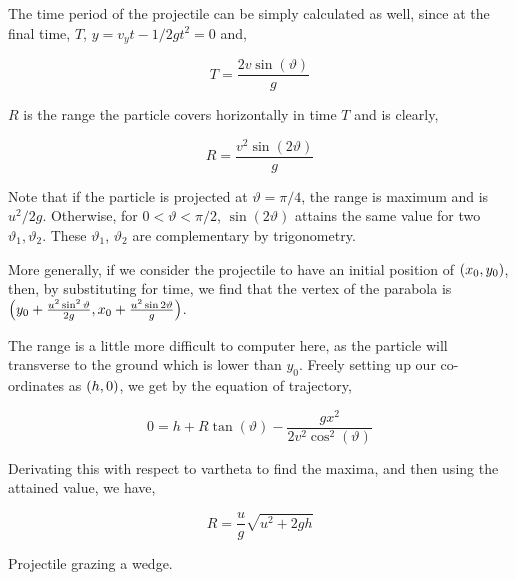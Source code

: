 The time period of the projectile can be simply calculated as well,
since at the final time, \(T\), \(y = v_yt - 1/2gt^2 = 0\) and,

\begin{equation}
    T = \frac{2v\sin(\vartheta)}{g}
\end{equation}

\(R\) is the range the particle covers horizontally in time \(T\) and is
clearly,

\begin{equation}
    R = \frac{v^2\sin(2\vartheta)}{g}
\end{equation}

Note that if the particle is projected at \(\vartheta = \pi/4\), 
the range is maximum and is \(u^2/2g\). Otherwise,
for \(0 < \vartheta < \pi/2\), \(\sin(2\vartheta)\) attains the same 
value for two \(\vartheta_1, \vartheta_2\). These \(\vartheta_1\), \(\vartheta_2\) are complementary
by trigonometry.

More generally, if we consider the projectile to have an initial position of 
\(\qty(x_0, y_0)\), then, by substituting for time, we find that the 
vertex of the parabola is \(\qty(y_0 + \frac{u^2\sin^2\vartheta}{2g}, x_0 + \frac{u^2\sin2\vartheta}{g})\).

The range is a little more difficult to computer here, as the particle will transverse to 
the ground which is lower than \(y_0\). Freely setting up our co-ordinates 
as \(\qty(h, 0)\), we get by the equation of trajectory,

\[
    0 = h + R\tan(\vartheta) - \frac{gx^2}{2v^2\cos^2(\vartheta)}
\]

Derivating this with respect to vartheta to find the maxima, and then using the attained
value, we have, 

\begin{equation}
    R = \frac{u}{g}\sqrt{u^2 + 2gh}
\end{equation}

\begin{marginfigure}
    \caption{Projectile grazing a wedge.}
\end{marginfigure}

